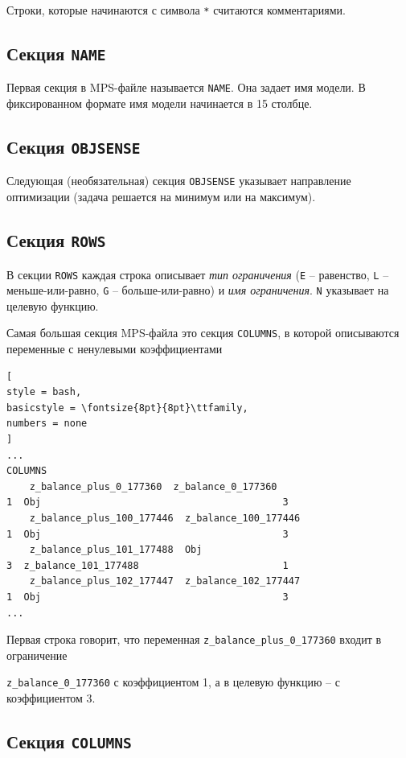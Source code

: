 \documentclass[%
	11pt,
	a4paper,
	utf8,
		]{article}
\begin{document}
Строки, которые начинаются с символа \verb|*| считаются комментариями.

\subsection{Секция \texttt{NAME}}
Первая секция в MPS-файле называется \verb|NAME|. Она задает имя модели. В фиксированном формате имя модели начинается в 15 столбце.

\subsection{Секция \texttt{OBJSENSE}}

Следующая (необязательная) секция \verb|OBJSENSE| указывает направление оптимизации (задача решается на минимум или на максимум).

\subsection{Секция \texttt{ROWS}}

В секции \verb|ROWS| каждая строка описывает \emph{тип ограничения} (\verb|E| -- равенство, \verb|L| -- меньше-или-равно, \verb|G| -- больше-или-равно) и \emph{имя ограничения}. \verb|N| указывает на целевую функцию.

Самая большая секция MPS-файла это секция \verb|COLUMNS|, в которой описываются переменные с ненулевыми коэффициентами
\begin{lstlisting}[
style = bash,
basicstyle = \fontsize{8pt}{8pt}\ttfamily,
numbers = none
]
...
COLUMNS
    z_balance_plus_0_177360  z_balance_0_177360                           1  Obj                                          3
    z_balance_plus_100_177446  z_balance_100_177446                         1  Obj                                          3
    z_balance_plus_101_177488  Obj                                          3  z_balance_101_177488                         1
    z_balance_plus_102_177447  z_balance_102_177447                         1  Obj                                          3
...
\end{lstlisting}

Первая строка говорит, что переменная \verb|z_balance_plus_0_177360| входит в ограничение

\noindent\verb|z_balance_0_177360| с коэффициентом 1, а в целевую функцию -- с коэффициентом 3.

\subsection{Секция \texttt{COLUMNS}}
\end{document}

